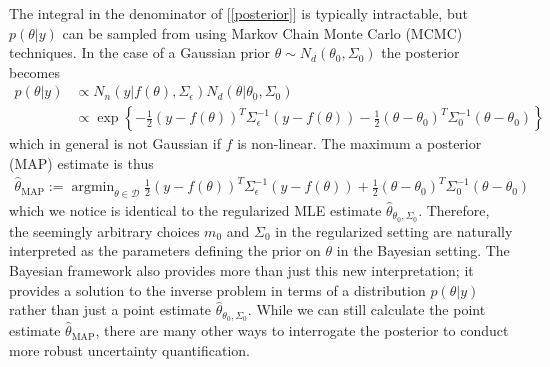 \documentclass[12pt]{article}
\DeclareMathOperator*{\argmin}{argmin}
\begin{document}
The integral in the denominator of [\ref{posterior}] is typically intractable, but $p(\theta|y)$ can be sampled from using Markov Chain Monte Carlo (MCMC) techniques. In the case of a Gaussian prior 
$\theta \sim N_d(\theta_0, \Sigma_0)$ the posterior becomes
\begin{align}
p(\theta|y) &\propto N_n(y|f(\theta), \Sigma_\epsilon)N_d(\theta|\theta_0, \Sigma_0) \\
 		&\propto \exp\left\{-\frac{1}{2} (y - f(\theta))^T \Sigma_\epsilon^{-1} (y - f(\theta)) - \frac{1}{2} (\theta - \theta_0)^T \Sigma_0^{-1}(\theta - \theta_0) \right\} \nonumber
\end{align}
which in general is not Gaussian if $f$ is non-linear. The maximum a posterior (MAP) estimate is thus
\begin{align}
\hat{\theta}_{\text{MAP}} := \argmin_{\theta \in \mathcal{D}} \frac{1}{2} (y - f(\theta))^T \Sigma_\epsilon^{-1} (y - f(\theta)) + \frac{1}{2} (\theta - \theta_0)^T \Sigma_0^{-1}(\theta - \theta_0) \label{MAP}
\end{align}
which we notice is identical to the regularized MLE estimate $\hat{\theta}_{\theta_0, \Sigma_0}$. Therefore, the seemingly arbitrary choices $m_0$ and $\Sigma_0$ in the regularized setting are naturally 
interpreted as the parameters defining the prior on $\theta$ in the Bayesian setting. The Bayesian framework also provides more than just this new interpretation; it provides a solution to the inverse problem 
in terms of a distribution $p(\theta|y)$ rather than just a point estimate $\hat{\theta}_{\theta_0, \Sigma_0}$. While we can still calculate the point estimate $\hat{\theta}_{\text{MAP}}$, there are many other ways 
to interrogate the posterior to conduct more robust uncertainty quantification. 
\end{document}
